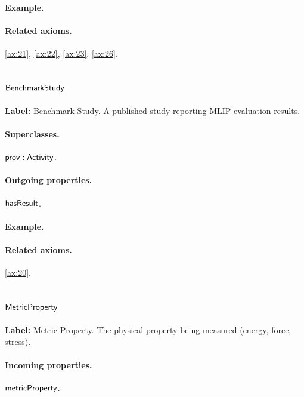 \paragraph{Example.}

\paragraph{Related axioms.} \eqref{ax:21}, \eqref{ax:22}, \eqref{ax:23}, \eqref{ax:26}.

\subsection{$\mathsf{BenchmarkStudy}$}
\label{sec:term-BenchmarkStudy}

\textbf{Label:} Benchmark Study.
A published study reporting MLIP evaluation results.

\paragraph{Superclasses.} $\mathsf{prov:Activity}$.

\paragraph{Outgoing properties.} $\mathsf{hasResult}$.

\paragraph{Example.}

\paragraph{Related axioms.} \eqref{ax:20}.

\subsection{$\mathsf{MetricProperty}$}
\label{sec:term-MetricProperty}

\textbf{Label:} Metric Property.
The physical property being measured (energy, force, stress).

\paragraph{Incoming properties.} $\mathsf{metricProperty}$.

